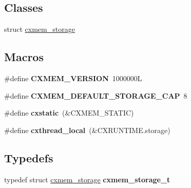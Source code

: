 \subsection*{Classes}
\begin{DoxyCompactItemize}
\item 
struct \hyperlink{a00056}{cxmem\+\_\+storage}
\end{DoxyCompactItemize}
\subsection*{Macros}
\begin{DoxyCompactItemize}
\item 
\mbox{\label{a00017_a71a23f5cbe64e9b426aabef1e04485a1}} 
\#define {\bfseries C\+X\+M\+E\+M\+\_\+\+V\+E\+R\+S\+I\+ON}~1000000L
\item 
\mbox{\label{a00017_ab3c2fc6fb7e39deb7335561f528e0c0c}} 
\#define {\bfseries C\+X\+M\+E\+M\+\_\+\+D\+E\+F\+A\+U\+L\+T\+\_\+\+S\+T\+O\+R\+A\+G\+E\+\_\+\+C\+AP}~8
\item 
\mbox{\label{a00017_a5707b6d44fd77907d5f2acea86cb40bb}} 
\#define {\bfseries cxstatic}~(\&C\+X\+M\+E\+M\+\_\+\+S\+T\+A\+T\+IC)
\item 
\mbox{\label{a00017_a2ab107701ba86364a8b580c2ed01881f}} 
\#define {\bfseries cxthread\+\_\+local}~(\&C\+X\+R\+U\+N\+T\+I\+M\+E.\+storage)
\end{DoxyCompactItemize}
\subsection*{Typedefs}
\begin{DoxyCompactItemize}
\item 
\mbox{\label{a00017_aace66181c4f439c1f67b868f3e930ec1}} 
typedef struct \hyperlink{a00056}{cxmem\+\_\+storage} {\bfseries cxmem\+\_\+storage\+\_\+t}
\end{DoxyCompactItemize}
